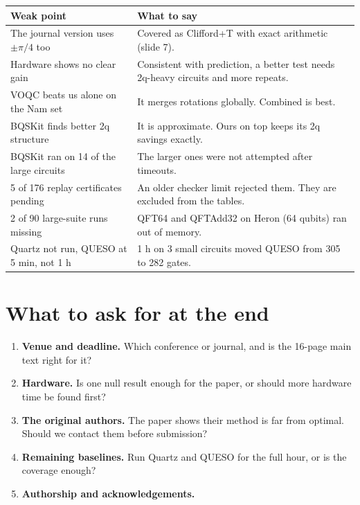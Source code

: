 \documentclass[11pt,a4paper]{article}
\begin{document}
\begin{center}\small\renewcommand{\arraystretch}{1.2}
\begin{tabularx}{\textwidth}{@{}L L@{}}
\toprule
Weak point & What to say\\
\midrule
The journal version uses $\pm\pi/4$ too & Covered as Clifford+T with exact arithmetic (slide 7).\\
Hardware shows no clear gain & Consistent with prediction, a better test needs 2q-heavy circuits and more repeats.\\
VOQC beats us alone on the Nam set & It merges rotations globally. Combined is best.\\
BQSKit finds better 2q structure & It is approximate. Ours on top keeps its 2q savings exactly.\\
BQSKit ran on 14 of the large circuits & The larger ones were not attempted after timeouts.\\
5 of 176 replay certificates pending & An older checker limit rejected them. They are excluded from the tables.\\
2 of 90 large-suite runs missing & QFT64 and QFTAdd32 on Heron (64 qubits) ran out of memory.\\
Quartz not run, QUESO at 5 min, not 1 h & 1 h on 3 small circuits moved QUESO from 305 to 282 gates.\\
\bottomrule
\end{tabularx}
\end{center}

\section{What to ask for at the end}\label{sec:ask}

\begin{enumerate}
  \item \textbf{Venue and deadline.} Which conference or journal, and is the 16-page main text right for it?
  \item \textbf{Hardware.} Is one null result enough for the paper, or should more hardware time be found first?
  \item \textbf{The original authors.} The paper shows their method is far from optimal. Should we contact them before
        submission?
  \item \textbf{Remaining baselines.} Run Quartz and QUESO for the full hour, or is the coverage enough?
  \item \textbf{Authorship and acknowledgements.}
\end{enumerate}
\end{document}
